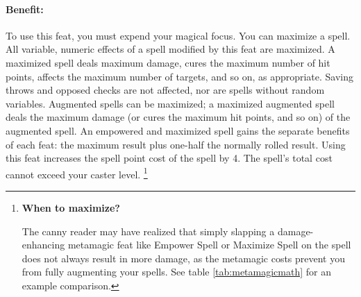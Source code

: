 \paragraph{Benefit:} To use this feat, you must expend your magical focus.
You can maximize a spell. All variable, numeric effects of a spell modified by this feat are maximized. 
A maximized spell deals maximum damage, cures the maximum number of hit points, affects the maximum number of targets, and so on, as appropriate. 
Saving throws and opposed checks are not affected, nor are spells without random variables.
Augmented spells can be maximized; a maximized augmented spell deals the maximum damage (or cures the maximum hit points, and so on) of the augmented spell.
An empowered and maximized spell gains the separate benefits of each feat: the maximum result plus one-half the normally rolled result.
Using this feat increases the spell point cost of the spell by 4. The spell's total cost cannot exceed your caster level.
\footnote{\textbf{When to maximize?}

The canny reader may have realized that simply slapping a damage-enhancing metamagic feat like Empower Spell or Maximize Spell
on the spell does not always result in more damage, as the metamagic costs prevent you from fully augmenting your spells.
See table \ref{tab:metamagicmath} for an example comparison.}
